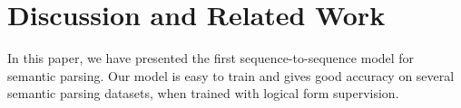 \documentclass[11pt,letterpaper]{article}
\newcommand{\regex}{\textsc{Regex}\xspace}
\begin{document}
%
%
%

\section{Discussion and Related Work}
\label{sec:discussion}
In this paper, we have presented the first sequence-to-sequence
model for semantic parsing.  Our model is easy to train
and gives good accuracy on several semantic parsing
datasets, when trained with logical form supervision.
\end{document}
